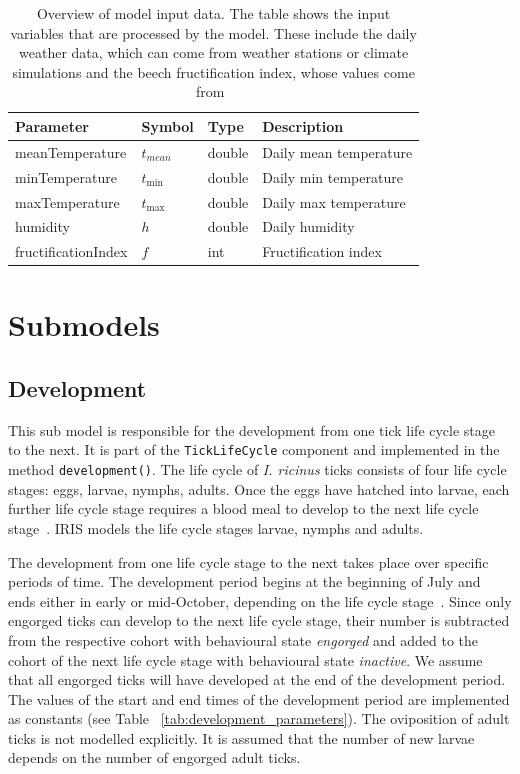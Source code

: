 \documentclass[a4paper, 11pt]{scrartcl}
\newcommand{\inlinecode}[1]{\texttt{\small #1}}
\begin{document}
\begin{table}[h!]
\caption[Overview of model input data.]{Overview of model input data. The table shows the input variables that are processed by the model. These include the daily weather data, which can come from weather stations or climate simulations and the beech fructification index, whose values come from~\textcite{Konnert.2016}}
\label{tab:input_parameters}
\begin{tabularx}{\textwidth}{llll}
\toprule
\textbf{Parameter} & \textbf{Symbol} & \textbf{Type}     & \textbf{Description}       \\
\midrule
meanTemperature    & $t_{mean}$      & double            & Daily mean temperature     \\
minTemperature     & $t_{\min}$      & double            & Daily min temperature      \\
maxTemperature     & $t_{\max}$      & double            & Daily max temperature      \\
humidity           & $h$             & double            & Daily humidity             \\
\midrule
fructificationIndex & $f$            & int               & Fructification index		  \\
\bottomrule
\end{tabularx}
\end{table}


\newpage
\section{Submodels}\label{submodels}

\subsection{Development}
This sub model is responsible for the development from one tick life cycle stage to the next. It is part of the \inlinecode{TickLifeCycle} component and implemented in the method \inlinecode{development()}. The life cycle of \textit{I. ricinus} ticks consists of four life cycle stages: eggs, larvae, nymphs, adults. Once the eggs have hatched into larvae, each further life cycle stage requires a blood meal to develop to the next life cycle stage~\parencite{tba}. IRIS models the life cycle stages larvae, nymphs and adults.

The development from one life cycle stage to the next takes place over specific periods of time. The development period begins at the beginning of July and ends either in early or mid-October, depending on the life cycle stage~\parencite{tba}. Since only engorged ticks can develop to the next life cycle stage, their number is subtracted from the respective cohort with behavioural state \emph{engorged} and added to the cohort of the next life cycle stage with behavioural state \emph{inactive}. We assume that all engorged ticks will have developed at the end of the development period. The values of the start and end times of the development period are implemented as constants (see Table ~\ref{tab:development_parameters}). The oviposition of adult ticks is not modelled explicitly. It is assumed that the number of new larvae depends on the number of engorged adult ticks.
\end{document}
